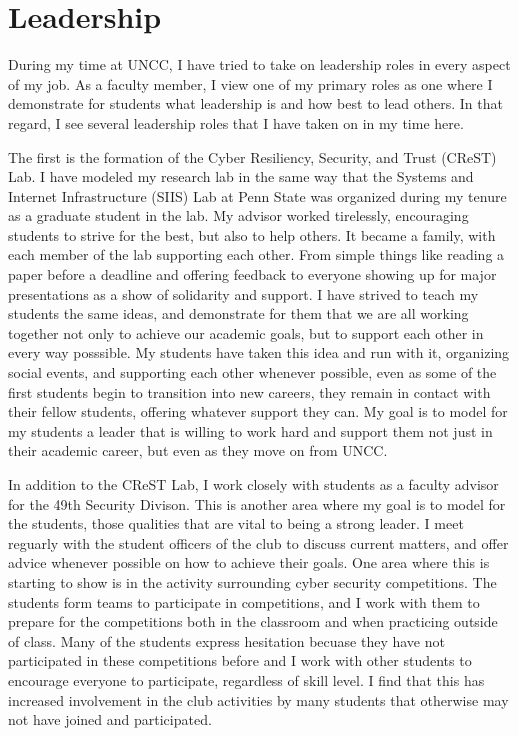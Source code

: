 
\hypertarget{leadership}{%
\section{Leadership}\label{leadership}}

During my time at UNCC, I have tried to take on leadership roles in every aspect of my job. As a faculty member, I view one of my primary roles as one where I demonstrate for students what leadership is and how best to lead others. In that regard, I see several leadership roles that I have taken on in my time here.

The first is the formation of the Cyber Resiliency, Security, and Trust (CReST) Lab. I have modeled my research lab in the same way that the Systems and Internet Infrastructure (SIIS) Lab at Penn State was organized during my tenure as a graduate student in the lab. My advisor worked tirelessly, encouraging students to strive for the best, but also to help others. It became a family, with each member of the lab supporting each other. From simple things like reading a paper before a deadline and offering feedback to everyone showing up for major presentations as a show of solidarity and support. I have strived to teach my students the same ideas, and demonstrate for them that we are all working together not only to achieve our academic goals, but to support each other in every way posssible. My students have taken this idea and run with it, organizing social events, and supporting each other whenever possible, even as some of the first students begin to transition into new careers, they remain in contact with their fellow students, offering whatever support they can. My goal is to model for my students a leader that is willing to work hard and support them not just in their academic career, but even as they move on from UNCC.

In addition to the CReST Lab, I work closely with students as a faculty advisor for the 49th Security Divison. This is another area where my goal is to model for the students, those qualities that are vital to being a strong leader. I meet reguarly with the student officers of the club to discuss current matters, and offer advice whenever possible on how to achieve their goals. One area where this is starting to show is in the activity surrounding cyber security competitions. The students form teams to participate in competitions, and I work with them to prepare for the competitions both in the classroom and when practicing outside of class. Many of the students express hesitation becuase they have not participated in these competitions before and I work with other students to encourage everyone to participate, regardless of skill level. I find that this has increased involvement in the club activities by many students that otherwise may not have joined and participated.

